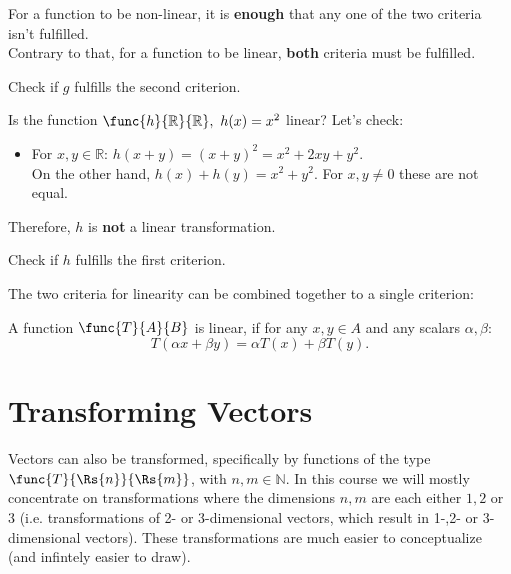 \begin{warning}
  For a function to be non-linear, it is \textbf{enough} that any one of the two criteria isn't fulfilled.\\
  Contrary to that, for a function to be linear, \textbf{both} criteria must be fulfilled.
\end{warning}

\begin{challange}
  Check if $g$ fulfills the second criterion.
\end{challange}

\begin{example}
  Is the function $\func{h}{\mathbb{R}}{\mathbb{R}},\ h(x)=x^{2}$ linear? Let's check:
  \begin{itemize}
  \item For $x,y\in\mathbb{R}$: $h(x+y) = \left(x+y\right)^{2} = x^{2}+2xy+y^{2}$.\\
  On the other hand, $h(x)+h(y) = x^{2}+y^{2}$. For $x,y\neq0$ these are not equal.
  \end{itemize}
  Therefore, $h$ is \textbf{not} a linear transformation.
\end{example}

\begin{challange}
  Check if $h$ fulfills the first criterion.
\end{challange}

The two criteria for linearity can be combined together to a single criterion:
\begin{mathdef}
  A function $\func{T}{A}{B}$ is linear, if for any $x,y\in A$ and any scalars $\alpha, \beta$:
  \begin{equation*}
  T\left(\alpha x + \beta y\right) = \alpha T(x) + \beta T(y).
  \end{equation*}
\end{mathdef}

\section{Transforming Vectors}
Vectors can also be transformed, specifically by functions of the type $\func{T}{\Rs{n}}{\Rs{m}}$, with $n, m\in\mathbb{N}$. In this course we will mostly concentrate on transformations where the dimensions $n,m$ are each either $1,2$ or $3$ (i.e. transformations of 2- or 3-dimensional vectors, which result in 1-,2- or 3-dimensional vectors). These transformations are much easier to conceptualize (and infintely easier to draw).

